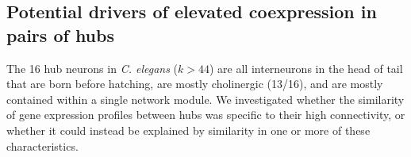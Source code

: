 \documentclass[10pt,letterpaper]{article}
\begin{document}
\subsection*{Potential drivers of elevated coexpression in pairs of hubs}
The 16 hub neurons in \emph{C. elegans} ($k > 44$) are all interneurons in the head of tail that are born before hatching, are mostly cholinergic (13/16), and are mostly contained within a single network module.
We investigated whether the similarity of gene expression profiles between hubs was specific to their high connectivity, or whether it could instead be explained by similarity in one or more of these characteristics.


\end{document}
